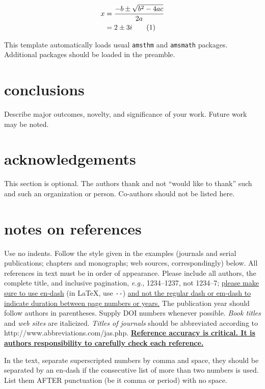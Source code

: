 \documentclass[10pt]{article}
\newcommand\num{\addtocounter{equation}{1}\tag{\theequation}}
\renewcommand{\theequation}{\arabic{equation}}
\begin{document}
\begin{align*}
x &= \dfrac{-b \pm \sqrt{b^2 - 4ac}}{2a} \\
  &= 2 \pm 3i \num \label{eqn2}
\end{align*}

This template automatically loads usual \verb+amsthm+ and \verb+amsmath+ packages.  Additional packages should be loaded in the preamble.  

\section*{conclusions}
Describe major outcomes, novelty, and significance of your work. Future work may be noted.

\section*{acknowledgements}
This section is optional. The authors thank and not ``would like to thank'' such and such an organization or person. Co-authors should not be listed here.

\section*{notes on references}

Use no indents. Follow the style given in the examples (journals and serial publications;\cite{journal} chapters and monographs;\cite{chapters} web sources,\cite{web} correspondingly) below. All references in text must be in order of appearance. Please include all authors, the complete title, and inclusive pagination, \textit{e.g.}, 1234--1237, not 1234--7; \ul{please make sure to use en-dash} (in \LaTeX, use \verb+--+) \ul{and not the regular dash or em-dash to indicate duration between page numbers or years.} The publication year should follow authors in parentheses. Supply DOI numbers whenever possible. \textit{Book titles} and \textit{web sites} are italicized. \textit{Titles of journals} should be abbreviated according to http://www.abbreviations.com/jas.php. \textbf{\ul{Reference accuracy is critical. It is authors responsibility to carefully check each reference.}} 

In the text, separate superscripted numbers by comma and space,\cite{journal,chapters} they should be separated by an en-dash if the consecutive list of more than two numbers is used.\cite{journal,chapters,web} List them AFTER punctuation (be it comma or period) with no space.
\end{document}
